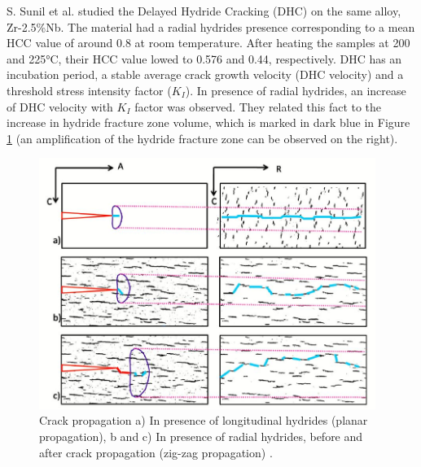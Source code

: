 S. Sunil et al. \cite{SUNIL2020152457} studied the Delayed Hydride Cracking (DHC) on the same alloy, Zr-2.5\%Nb. The material had a radial hydrides presence corresponding to a mean HCC value of around 0.8 at room temperature. After heating the samples at 200 and 225°C, their HCC value lowed to 0.576 and 0.44, respectively. DHC has an incubation period, a stable average crack growth velocity (DHC velocity) and a threshold stress intensity factor ($K_I$). In presence of radial hydrides, an increase of DHC velocity with $K_I$ factor was observed. They related this fact to the increase in hydride fracture zone volume, which is marked in dark blue in Figure \ref{fig:ref3} (an amplification of the hydride fracture zone can be observed on the right).

\begin{figure}[h] %
    \centering
    \includegraphics[width=4.3in]{Figures/4-Lit. Review/propagation.JPG}
    \caption{Crack propagation a) In presence of longitudinal hydrides (planar propagation), b and c) In presence of radial hydrides, before and after crack propagation (zig-zag propagation)  \cite{SUNIL2020152457}.}
    \label{fig:ref3}
\end{figure}


\cite{COLAS2013586}

\cite{SUNIL2020152457}